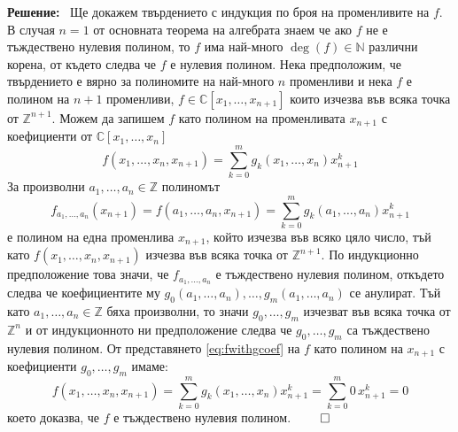\documentclass[a4paper,12pt,fleqn]{article}
\newcommand\solution{%
  \textbf{Решение:}~%
}
\begin{document}
    \solution{Ще докажем твърдението с индукция по броя на променливите на \( f \). В случая \( n = 1 \) от основната теорема на алгебрата знаем че ако \( f \) не е тъждествено нулевия полином, то \( f \) има най-много \( \deg(f) \in \mathbb{N} \) различни корена, от където следва че \( f \) е нулевия полином. Нека предположим, че твърдението е вярно за полиномите на най-много \( n \) променливи и нека \( f \) е полином на \( n + 1 \) променливи, \( f \in \mathbb{C}\left[ x_{1},\dots,x_{n+1} \right] \) които изчезва във всяка точка от \( \mathbb{Z}^{n+1} \). Можем да запишем \( f \) като полином на променливата \( x_{n+1} \) с коефициенти от \( \mathbb{C}\left[ x_{1},\dots,x_{n} \right] \) 
    \begin{equation}\label{eq:fwithgcoef}
        f\left( x_{1},\dots,x_{n},x_{n+1} \right) = \sum_{k=0}^{m}g_{k}\left( x_{1},\dots,x_{n} \right)x_{n+1}^{k}
    \end{equation}
    За произволни \( a_{1},\dots,a_{n} \in \mathbb{Z} \) полиномът
    \begin{equation*}
        f_{a_{1},\dots,a_{n}}\left( x_{n+1} \right) = f\left( a_{1},\dots,a_{n},x_{n+1} \right) = \sum_{k=0}^{m}g_{k}\left( a_{1},\dots,a_{n} \right)x_{n+1}^{k}
    \end{equation*}
    е полином на една променлива \( x_{n+1} \), който изчезва във всяко цяло число, тъй като \( f\left( x_{1},\dots,x_{n},x_{n+1} \right) \) изчезва във всяка точка от \( \mathbb{Z}^{n+1} \). По индукционно предположение това значи, че \( f_{a_{1},\dots,a_{n}} \) е тъждествено нулевия полином, откъдето следва че коефициентите му \(g_{0}\left( a_{1},\dots,a_{n} \right),\dots, g_{m}\left( a_{1},\dots,a_{n} \right)\) се анулират. Тъй като \( a_{1},\dots,a_{n} \in \mathbb{Z}\) бяха произволни, то значи \( g_{0},\dots,g_{m} \) изчезват във всяка точка от \( \mathbb{Z}^{n} \) и от индукционното ни предположение следва че \( g_{0},\dots,g_{m} \) са тъждествено нулевия полином. От представянето \eqref{eq:fwithgcoef} на \( f \) като полином на \( x_{n+1} \) с коефициенти \( g_{0},\dots,g_{m} \) имаме: 
    \begin{equation*}
        f\left( x_{1},\dots,x_{n},x_{n+1} \right) = \sum_{k=0}^{m}g_{k}\left( x_{1},\dots,x_{n} \right)x_{n+1}^{k} = \sum_{k=0}^{m}0\,x_{n+1}^{k}=0
    \end{equation*}
    което доказва, че \( f \) е тъждествено нулевия полином. \hfill \( \qed\)
    }
\end{document}
